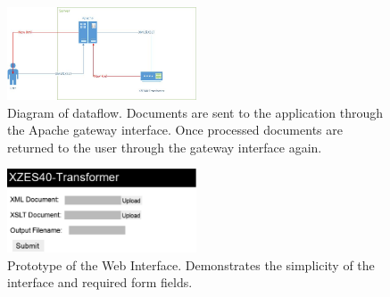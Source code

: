 % 
% 
% 
% 
% 

\begin{figure}[H]
  \centering
  \captionsetup{justification=centering,margin=2cm}
  \includegraphics[width=0.5\textwidth]{figures/document-flow-digram}
  \caption{
    Diagram of dataflow.
    Documents are sent to the application through the Apache gateway interface.
    Once processed documents are returned to the user through the gateway interface again.
  }
\end{figure}
        
\begin{figure}[H]
  \centering
  \captionsetup{justification=centering,margin=2cm}
  \includegraphics[width=0.5\textwidth]{figures/website-raw}
  \caption{
    Prototype of the Web Interface.
    Demonstrates the simplicity of the interface and required form fields.
  }
\end{figure}

